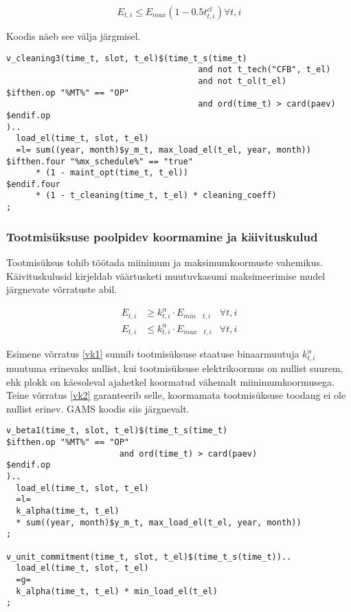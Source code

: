 \documentclass[10pt,a4paper]{article}
\begin{document}
\begin{equation}
E_{t,i} \leq \mathit{E}_{max} (1 - 0.5 t^{cl}_{t,i}) \forall t,i
\end{equation}


Koodis näeb see välja järgmisel.
\begin{verbatim}
v_cleaning3(time_t, slot, t_el)$(time_t_s(time_t)
                                       and not t_tech("CFB", t_el)
                                       and not t_ol(t_el)
$ifthen.op "%MT%" == "OP"
                                       and ord(time_t) > card(paev)
$endif.op
)..
  load_el(time_t, slot, t_el)
  =l= sum((year, month)$y_m_t, max_load_el(t_el, year, month))
$ifthen.four "%mx_schedule%" == "true"
      * (1 - maint_opt(time_t, t_el))
$endif.four
      * (1 - t_cleaning(time_t, t_el) * cleaning_coeff)
;
\end{verbatim}

\subsubsection{Tootmisüksuse poolpidev koormamine ja käivituskulud}
Tootmisüksus tohib töötada miinimum ja maksimumkoormuste vahemikus. Käi\-vitus\-kulusid kirjeldab väärtusketi muutuvkasumi maksimeerimise mudel järg\-nevate võrratuste abil. 

\begin{align}
E_{t,i} &\geq k^\alpha_{t,i} \cdot E_{min \quad t,i} & \forall t,i \label{vk1} \\
E_{t,i} &\leq k^\alpha_{t,i} \cdot E_{max \quad t,i} & \forall t,i \label{vk2}
\end{align}

Esimene võrratus \eqref{vk1} sunnib tootmisüksuse staatuse binaarmuutuja $k^\alpha_{t,i}$ muutuma erinevaks nullist, kui tootmisüksuse elektrikoormus on nullist suurem, ehk plokk on käesoleval ajahetkel koormatud vähemalt miinimumkoormusega. Teine võrratus \eqref{vk2} garanteerib selle, koormamata tootmisüksuse toodang ei ole nullist erinev. GAMS koodis siis järgnevalt.

\begin{verbatim}
v_beta1(time_t, slot, t_el)$(time_t_s(time_t)
$ifthen.op "%MT%" == "OP"
                       and ord(time_t) > card(paev)
$endif.op
)..
  load_el(time_t, slot, t_el)
  =l=
  k_alpha(time_t, t_el) 
  * sum((year, month)$y_m_t, max_load_el(t_el, year, month))
;

v_unit_commitment(time_t, slot, t_el)$(time_t_s(time_t))..
  load_el(time_t, slot, t_el)
  =g=
  k_alpha(time_t, t_el) * min_load_el(t_el)
;

\end{verbatim}
\end{document}
